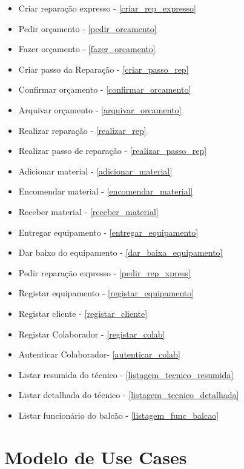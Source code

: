 \documentclass[a4paper,12pt]{scrreprt}
\begin{document}
\begin{itemize}
    \item Criar reparação expresso - \ref{criar_rep_expresso}
    \item Pedir orçamento - \ref{pedir_orcamento}
    \item Fazer orçamento - \ref{fazer_orcamento}
    \item Criar passo da Reparação - \ref{criar_passo_rep}
    \item Confirmar orçamento - \ref{confirmar_orcamento}
    \item Arquivar orçamento - \ref{arquivar_orcamento}
    \item Realizar reparação - \ref{realizar_rep}
    \item Realizar passo de reparação - \ref{realizar_passo_rep}
    \item Adicionar material - \ref{adicionar_material}
    \item Encomendar material - \ref{encomendar_material}
    \item Receber material - \ref{receber_material}
    \item Entregar equipamento - \ref{entregar_equipamento}
    \item Dar baixo do equipamento - \ref{dar_baixa_equipamento}
    \item Pedir reparação expresso - \ref{pedir_rep_xpress}
    \item Registar equipamento - \ref{registar_equipamento}
    \item Registar cliente - \ref{registar_cliente}
    \item Registar Colaborador - \ref{registar_colab}
    \item Autenticar Colaborador- \ref{autenticar_colab}
    \item Listar resumida do técnico - \ref{listagem_tecnico_resumida}
    \item Listar detalhada do técnico - \ref{listagem_tecnico_detalhada}
    \item Listar funcionário do balcão - \ref{listagem_func_balcao}
\end{itemize}
\section{Modelo de Use Cases}
\end{document}
